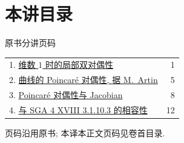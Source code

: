 \section*{本讲目录}
\begingroup\small
\noindent\hfill 原书分讲页码\par\smallskip
\begin{tabular}{@{}p{.87\linewidth}r@{}}
1. \hyperref[V:1]{维数 $1$ 时的局部双对偶性} & 1\\
2. \hyperref[V:2]{曲线的 Poincaré 对偶性, 据 M.\ Artin} & 5\\
3. \hyperref[V:3]{Poincaré 对偶性与 Jacobian} & 8\\
4. \hyperref[V:4]{与 SGA 4 XVIII 3.1.10.3 的相容性} & 12
\end{tabular}
\par\medskip
\noindent 页码沿用原书; 本译本正文页码见卷首目录.
\endgroup
\clearpage
